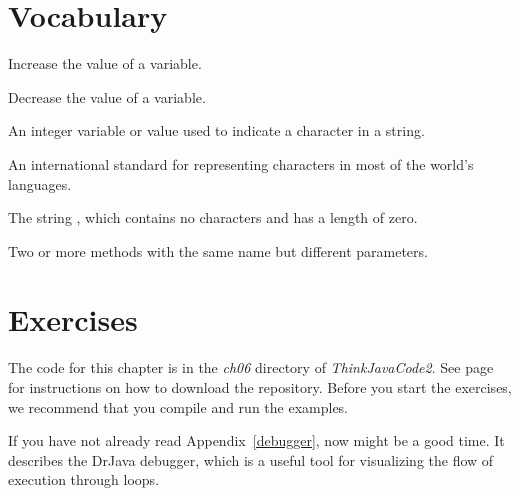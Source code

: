 \section{Vocabulary}

\begin{description}

Increase the value of a variable.

Decrease the value of a variable.

An integer variable or value used to indicate a character in a string.

An international standard for representing characters in most of the world's languages.

The string , which contains no characters and has a length of zero.

Two or more methods with the same name but different parameters.

\end{description}


\section{Exercises}

The code for this chapter is in the {\it ch06} directory of {\it ThinkJavaCode2}.
See page~\pageref{code} for instructions on how to download the repository.
Before you start the exercises, we recommend that you compile and run the examples.

If you have not already read Appendix~\ref{debugger}, now might be a good time.
It describes the DrJava debugger, which is a useful tool for visualizing the flow of execution through loops.


